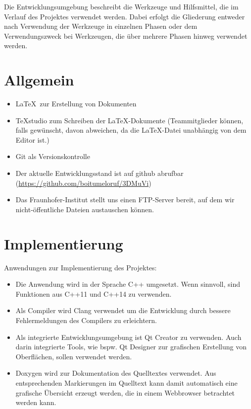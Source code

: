 
Die Entwicklungsumgebung beschreibt die Werkzeuge und Hilfsmittel, die im Verlauf des Projektes verwendet werden. Dabei erfolgt die Gliederung entweder nach Verwendung der Werkzeuge in einzelnen Phasen oder dem Verwendungszweck bei Werkzeugen, die über mehrere Phasen hinweg verwendet werden.

\section{Allgemein}
	\begin{itemize}
		\item \LaTeX\ zur Erstellung von Dokumenten
		\item TeXstudio zum Schreiben der \LaTeX-Dokumente (Teammitglieder können, falls gewünscht, davon abweichen, da die \LaTeX-Datei unabhängig von dem Editor ist.)
		\item Git als Versionskontrolle
		\item Der aktuelle Entwicklungsstand ist auf github abrufbar
		\newline(\href{https://github.com/boitumeloruf/3DMuVi}{https://github.com/boitumeloruf/3DMuVi})
		\item Das Fraunhofer-Institut stellt uns einen FTP-Server bereit, auf dem wir nicht-öffentliche Dateien austauschen können.
	\end{itemize}
\section{Implementierung}
	Anwendungen zur Implementierung des Projektes:
	\begin{itemize}
		\item Die Anwendung wird in der Sprache C++ umgesetzt. Wenn sinnvoll, sind Funktionen aus C++11 und C++14 zu verwenden.
		\item Als Compiler wird Clang verwendet um die Entwicklung durch bessere Fehlermeldungen des Compilers zu erleichtern.
		\item Als integrierte Entwicklungsumgebung ist Qt Creator zu verwenden. Auch darin integrierte Tools, wie bspw. Qt Designer zur grafischen Erstellung von Oberflächen, sollen verwendet werden.
		\item Doxygen wird zur Dokumentation des Quelltextes verwendet. Aus entsprechenden Markierungen im Quelltext kann damit automatisch eine grafische Übersicht erzeugt werden, die in einem Webbrowser betrachtet werden kann.
	\end{itemize}
